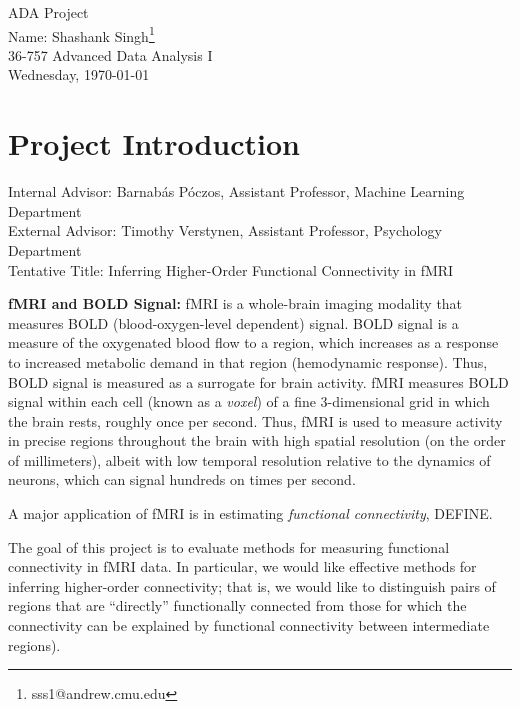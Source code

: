 \documentclass[11pt]{article}
\makeatletter
\newcommand{\myname}{Shashank Singh\footnote{sss1@andrew.cmu.edu}}
\newcommand{\myclass}{36-757 Advanced Data Analysis I}
\newcommand{\myhwname}{ADA Project}
\newcommand{\duedate}{Wednesday, \today}
\makeatother
\begin{document}
\thispagestyle{plain}

{\Large \myhwname} \\
Name: \myname \\
\myclass \\
\duedate

\section{Project Introduction}
Internal Advisor: Barnab\'as P\'oczos, Assistant Professor, Machine Learning
Department  \\
External Advisor: Timothy Verstynen, Assistant Professor, Psychology
Department  \\
Tentative Title: Inferring Higher-Order Functional Connectivity in fMRI

{\bf fMRI and BOLD Signal:}
fMRI is a whole-brain imaging modality that measures BOLD (blood-oxygen-level
dependent) signal. BOLD signal is a measure of the oxygenated blood flow to a
region, which increases as a response to increased metabolic demand in that
region (hemodynamic response). Thus, BOLD signal is measured as a surrogate for
brain activity. fMRI measures BOLD signal within each cell (known as a
\emph{voxel}) of a fine 3-dimensional grid in which the brain rests, roughly
once per second. Thus, fMRI is used to measure activity in precise regions
throughout the brain with high spatial resolution (on the order of
millimeters), albeit with low temporal resolution relative to the dynamics of
neurons, which can signal hundreds on times per second.

A major application of fMRI is in estimating \emph{functional connectivity},
DEFINE.

The goal of this project is to evaluate methods for measuring functional
connectivity in fMRI data. In particular, we would like effective methods for
inferring higher-order connectivity; that is, we would like to distinguish pairs
of regions that are ``directly'' functionally connected from those for which
the connectivity can be explained by functional connectivity between
intermediate regions).
\end{document}

